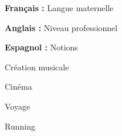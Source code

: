 \documentclass[a4paper,11pt]{article}
\begin{document}
\begin{cv}[profile][2]
\begin{cvitem}
    \textbf{Français :} Langue maternelle
\end{cvitem}

\cvseparator
\begin{cvitem}
    \textbf{Anglais :} Niveau professionnel
\end{cvitem}

\cvseparator
\begin{cvitem}
    \textbf{Espagnol :} Notions
\end{cvitem}

\begin{cvitem}
    Création musicale
\end{cvitem}

\cvseparator
\begin{cvitem}
    Cinéma
\end{cvitem}

\cvseparator
\begin{cvitem}
    Voyage
\end{cvitem}

\cvseparator
\begin{cvitem}
    Running
\end{cvitem}

\end{cv}
\end{document}
